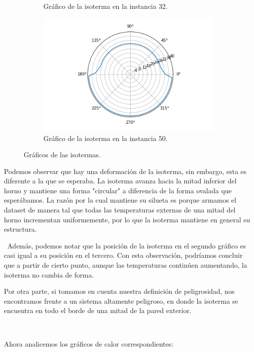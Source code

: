 \begin{figure}[H]
\begin{subfigure}{0.24\linewidth}
        \caption{Gráfico de la isoterma en la instancia 32.}
        \label{fig:D3_40_80_31_isoterma}
    \end{subfigure}
    \hfill
    \begin{subfigure}{0.24\linewidth}
        \centering
        \includegraphics[scale=0.24]{img/EXP3/D3_40_80_49_isoterma}
        \caption{Gráfico de la isoterma en la instancia 50.}
        \label{fig:D3_40_80_49_isoterma}
    \end{subfigure}
    \caption{Gráficos de las isotermas.}
    \label{fig:D3_isotermas}
\end{figure}

Podemos observar que hay una deformación de la isoterma, sin embargo, esta es diferente a la que se esperaba. La isoterma avanza hacia la mitad inferior del horno y mantiene una forma "circular" a diferencia de la forma ovalada que esperábamos. La razón por la cual mantiene su silueta es porque armamos el dataset de manera tal que todas las temperaturas externas de una mitad del horno incrementan uniformemente, por lo que la isoterma mantiene en general su estructura.

\
Además, podemos notar que la posición de la isoterma en el segundo gráfico  es casi igual a su posición en el tercero. Con esta observación, podríamos concluir que a partir de cierto punto, aunque las temperaturas continúen aumentando, la isoterma no cambia de forma. 
\

Por otra parte, si tomamos en cuenta nuestra definición de peligrosidad, nos encontramos frente a un sistema altamente peligroso, en donde la isoterma se encuentra en todo el borde de una mitad de la pared exterior. 

\

Ahora analicemos los gráficos de calor correspondientes:

